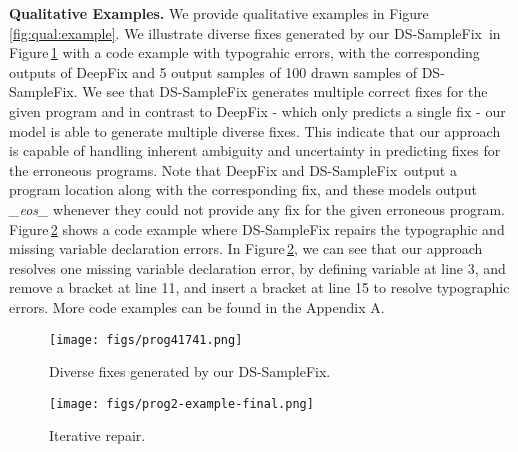 \documentclass[letterpaper]{article} \usepackage{aaai20}  \usepackage{times}  \usepackage{helvet} \usepackage{courier}  \usepackage[hyphens]{url}  \usepackage{graphicx}
\newcommand{\dssmaplefix}{DS-SampleFix}
\newcommand{\figref}{Figure}
\newcommand{\myparagraph}[1]{\vspace{0.0em}\noindent\textbf{#1.}}
\begin{document}
\myparagraph{Qualitative Examples} 
We provide qualitative examples in \figref  \,\ref{fig:qual:example}. We illustrate diverse fixes generated by our \dssmaplefix \, in \figref \,\ref{fig:example1} with a code example with typograhic errors, with the corresponding outputs of DeepFix and 5 output samples of 100 drawn samples of \dssmaplefix. We see that DS-SampleFix generates multiple correct fixes for the given program and in contrast to DeepFix - which only predicts a single fix - our model is able to generate multiple diverse fixes. This indicate that our approach is capable of handling inherent ambiguity and uncertainty in predicting fixes for the erroneous programs. Note that DeepFix and \dssmaplefix \, output a program location along with the corresponding fix, and these models output  \textit{\_eos\_} whenever they could not provide any fix for the given erroneous program. \figref \,\ref{fig:example2} shows a code example where DS-SampleFix repairs the typographic and missing variable declaration errors. In \figref \,\ref{fig:example2}, we can see that our approach resolves one missing variable declaration error, by defining variable  at line 3, and remove a bracket at line 11, and insert a bracket at line 15 to resolve typographic errors. More code examples can be found in the Appendix A.
\begin{figure*}[h] 
	\centering
	    \centering
	    
	    \begin{subfigure}[b]{0.49\textwidth}
	    \centering
		\texttt{[image: figs/prog41741.png]}
		\caption{Diverse fixes generated by our DS-SampleFix. }
		\label{fig:example1}
    	\end{subfigure} \hfill
    	\begin{subfigure}[b]{0.49\textwidth}
    	    \centering
    		\texttt{[image: figs/prog2-example-final.png]} 
    		\caption{Iterative repair.}
    		\label{fig:example2}
    	\end{subfigure} 
	
	\caption{(a) Left: Example program with a typographic error. The error is highlighted at line 19. (a) Right: Our DS-SampleFix generates multiple correct fixes (line number and fix), highlighting the ability of DS-SampleFix to generate diverse fixes (correct fixes with green tick). DeepFix is unable to generate any fix. (b) Examples of resolving typographic errors, and missing variable declaration errors using our approach (\dssmaplefix).}
	\label{fig:qual:example}
	\vspace{-.1cm}
\end{figure*}
\end{document}
